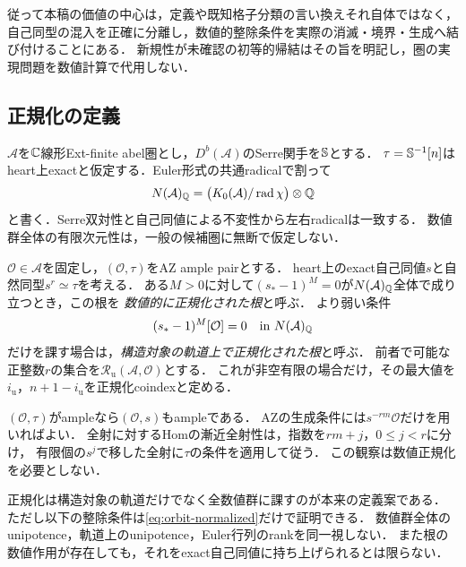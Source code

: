 \documentclass[11pt,a4paper]{ltjsarticle}
\newcommand{\Nnum}{N(\mathcal A)_{\Q}}
\newcommand{\Runi}{\mathcal R_{\mathrm u}}
\begin{document}
従って本稿の価値の中心は，定義や既知格子分類の言い換えそれ自体ではなく，
自己同型の混入を正確に分離し，数値的整除条件を実際の消滅・境界・生成へ結び付けることにある．
新規性が未確認の初等的帰結はその旨を明記し，圏の実現問題を数値計算で代用しない．

\subsection{正規化の定義}

$\mathcal A$を$\mathbb C$線形Ext-finite abel圏とし，$D^b(\mathcal A)$のSerre関手を$\mathbb S$とする．
$\tau=\mathbb S^{-1}[n]$はheart上exactと仮定する．Euler形式の共通radicalで割って
\[
 N(\mathcal A)_{\mathbb Q}=\bigl(K_0(\mathcal A)/\operatorname{rad}\chi\bigr)\otimes\mathbb Q
\]
と書く．Serre双対性と自己同値による不変性から左右radicalは一致する．
数値群全体の有限次元性は，一般の候補圏に無断で仮定しない．

\begin{definition}[数値的に正規化された根]\label{def:normalized}
$\mathcal O\in\mathcal A$を固定し，$(\mathcal O,\tau)$をAZ ample pairとする．
heart上のexact自己同値$s$と自然同型$s^r\simeq\tau$を考える．
ある$M>0$に対して$(s_*-1)^M=0$が$\Nnum$全体で成り立つとき，この根を
\emph{数値的に正規化された根}と呼ぶ．
より弱い条件
\begin{equation}\label{eq:orbit-normalized}
 (s_*-1)^M[\mathcal O]=0\quad\text{in }\Nnum
\end{equation}
だけを課す場合は，\emph{構造対象の軌道上で正規化された根}と呼ぶ．
前者で可能な正整数$r$の集合を$\Runi(\mathcal A,\mathcal O)$とする．
これが非空有限の場合だけ，その最大値を$i_{\mathrm u}$，$n+1-i_{\mathrm u}$を正規化coindexと定める．
\end{definition}

$(\mathcal O,\tau)$がampleなら$(\mathcal O,s)$もampleである．
AZの生成条件には$s^{-rm}\mathcal O$だけを用いればよい．
全射に対するHomの漸近全射性は，指数を$rm+j$，$0\le j<r$に分け，
有限個の$s^j$で移した全射に$\tau$の条件を適用して従う．
この観察は数値正規化を必要としない．

\begin{remark}
正規化は構造対象の軌道だけでなく全数値群に課すのが本来の定義案である．
ただし以下の整除条件は\eqref{eq:orbit-normalized}だけで証明できる．
数値群全体のunipotence，軌道上のunipotence，Euler行列のrankを同一視しない．
また根の数値作用が存在しても，それをexact自己同値に持ち上げられるとは限らない．
\end{remark}
\end{document}
